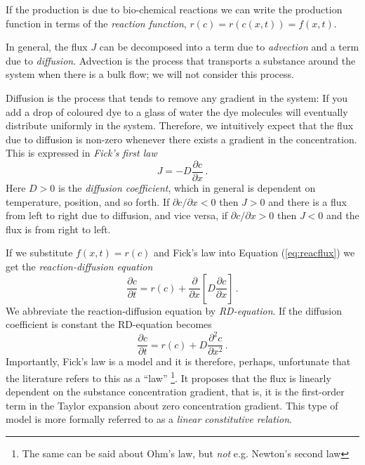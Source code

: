 If the production is due to bio-chemical reactions we can write the production function 
in terms of the \emph{reaction function}, $r(c) = r(c(x,t)) = f(x,t)$. 

In general, the flux $J$ can be decomposed into a term due to \emph{advection} and a
term due to \emph{diffusion}. Advection is the process that transports a substance
around the system when there is a bulk flow; we will not consider this process. 

Diffusion is the process that tends to remove any gradient in the system:
If you add a drop of coloured dye to a glass of water the dye molecules will
eventually distribute uniformly in the system. Therefore, we intuitively
expect that the flux due to diffusion is non-zero whenever there exists a
gradient in the concentration. This is expressed in \emph{Fick's first law} 
\begin{equation}
	J = -D\frac{\partial c}{\partial x} \, .
\end{equation}
Here $D > 0$ is the \emph{diffusion coefficient}, which in general is dependent on
temperature, position, and so forth. If $\partial c/\partial x < 0$ then $J>0$ and there
is a flux from left to right due to diffusion, and vice versa, if $\partial c/\partial x > 0$ then
$J<0$ and the flux is from right to left.

If we substitute $f(x,t)=r(c)$ and Fick's law into Equation (\ref{eq:reacflux}) we
get the \emph{reaction-diffusion equation} 
\begin{equation}
	\label{eq:reacfdif0}
	\frac{\partial c}{\partial t}= r(c) + \frac{\partial}{\partial
	x}\left[D\frac{\partial c}{\partial x} \right] \, . 
\end{equation}
We abbreviate the reaction-diffusion equation by \emph{RD-equation}. If the
diffusion coefficient is constant the RD-equation becomes
\begin{equation}
	\label{eq:reacfdif1}
	\frac{\partial c}{\partial t}= r(c) + D\frac{\partial^2 c}{\partial
	x^2} \, . 
\end{equation}
Importantly, Fick's law is a model and it is therefore, perhaps, unfortunate that
the literature refers to this as a ``law'' \footnote{The same can be said about
Ohm's law, but \emph{not} e.g. Newton's second law}. It proposes that the flux
is linearly dependent on the substance concentration gradient, that is, 
it is the first-order term in the Taylor expansion about zero concentration gradient.
This type of model is more formally referred to as a 
\emph{linear constitutive relation}.

